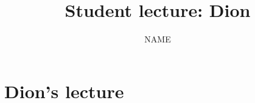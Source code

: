 \documentclass[11pt,reqno,oneside,a4paper]{article}
\title{Student lecture: Dion}
\author{NAME}
\begin{document}

\maketitle
\thispagestyle{fancy}


\section{Dion's lecture} \label{sec:Dion}

\end{document}

